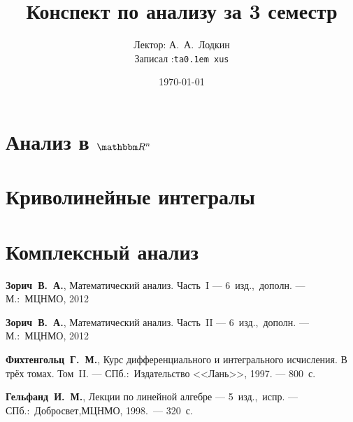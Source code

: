 \documentclass[12pt,ebook]{../notes}
\title{Конспект по анализу за 3 семестр}
\date{\today}
\author{Лектор: А.~А.~Лодкин \\
Записал :\texttt{ta\lower 0.1em \hbox{x}us}}
\begin{document}
 
\maketitle
\tableofcontents
\clearpage

\chapter{Анализ в \texorpdfstring{$\R^n$}{}}

\chapter{Криволинейные интегралы}

\chapter{Комплексный анализ}


\begin{thebibliography}{9}
  \textbf{Зорич~В.~А.}, 
  Математический анализ. Часть~I ---
  6~изд.,~дополн. ---
  М.:~МЦНМО, 2012
  
  \textbf{Зорич~В.~А.}, 
  Математический анализ. Часть~II ---
  6~изд.,~дополн. ---
  М.:~МЦНМО, 2012
  
  \textbf{Фихтенгольц~Г.~М.}, 
  Курс дифференциального и интегрального исчисления. В трёх томах. Том~II. ---
  СПб.:~Издательство <<Лань>>, 1997. ---
  800~с.
  
  \textbf{Гельфанд~И.~М.}, 
  Лекции по линейной алгебре --- 5~изд.,~испр. ---
  СПб.:~Добросвет,МЦНМО, 1998.~---
  320~с.
\end{thebibliography}
\end{document}
